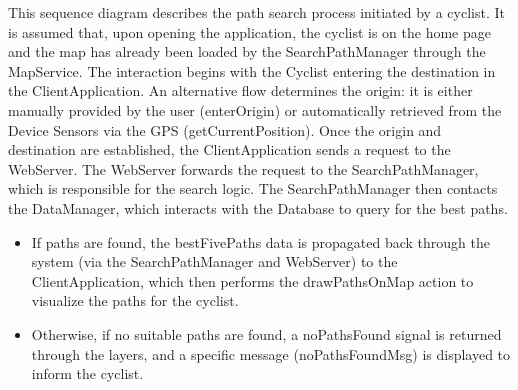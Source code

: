 \noindent
This sequence diagram describes the path search process initiated by a cyclist. It is assumed that, upon opening the application, the cyclist is on the home page and the map has already been loaded by the SearchPathManager through the MapService. The interaction begins with the Cyclist entering the destination in the ClientApplication. An alternative flow determines the origin: it is either manually provided by the user (enterOrigin) or automatically retrieved from the Device Sensors via the GPS (getCurrentPosition). Once the origin and destination are established, the ClientApplication sends a request to the WebServer. The WebServer forwards the request to the SearchPathManager, which is responsible for the search logic. The SearchPathManager then contacts the DataManager, which interacts with the Database to query for the best paths.

\begin{itemize}
    \item If paths are found, the bestFivePaths data is propagated back through the system (via the SearchPathManager and WebServer) to the ClientApplication, which then performs the drawPathsOnMap action to visualize the paths for the cyclist.
    \item Otherwise, if no suitable paths are found, a noPathsFound signal is returned through the layers, and a specific message (noPathsFoundMsg) is displayed to inform the cyclist.
\end{itemize}

